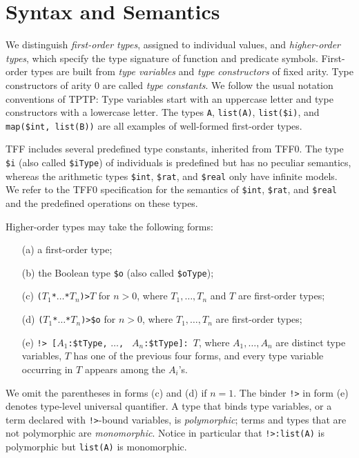 \section{Syntax and Semantics} \label{sec_logic}

We distinguish {\em first-order types}, assigned
to individual values, and {\em higher-order types\/},
which specify the type signature of function and predicate symbols.
%
First-order types are built from {\em type variables\/}
and {\em type constructors\/} of fixed arity. Type constructors
of arity 0 are called {\em type constants}. We follow the usual
notation conventions of TPTP: Type variables start with an
uppercase letter and type constructors with a lowercase letter.
The types \verb+A+, \verb+list(A)+, \verb+list($i)+, and
\verb+map($int,+~\verb+list(B))+ are all examples of well-formed first-order
types.

TFF includes several predefined type constants, inherited from TFF0.
The type \verb+$i+ (also called \verb+$iType+) of individuals is predefined
but has no peculiar semantics, whereas the arithmetic types
\verb+$int+, \verb+$rat+, and \verb+$real+ only have infinite models. We refer
to the TFF0 specification \cite{TFF0} for the semantics of
\verb+$int+, \verb+$rat+, and \verb+$real+ and the predefined operations on
these types. %

Higher-order types may take the following forms:
%
\begin{enumerate}
\item[(a)] a first-order type;
\item[(b)] the Boolean type \verb+$o+ (also called \verb+$oType+);
\item[(c)] {\tt ($T_1$\;*\;${\dots}$\;*\;$T_n$)\;>\;$T$} for $n > 0$,
where $T_1,\dots,T_n$ and $T$ are first-order types;
\item[(d)] {\tt ($T_1$\;*\;${\dots}$\;*\;$T_n$)\;>\;\$o} for $n > 0$,
where $T_1,\dots,T_n$ are first-order types;
\item[(e)] {\tt !>\ [$A_1$\;:\;\$tType,} {\tt ${\dots}$,} {\tt
$A_n$\;:\;\$tType]:\ $T$}, where $A_1,\dots,A_n$ are distinct type variables, $T$
has one of the previous four forms, and every type variable occurring in $T$
appears among the $A_i$'s.
\end{enumerate}
%
We omit the parentheses in forms (c) and (d) if $n = 1$. The binder {\tt !>} in
form (e) denotes type-level universal quantifier. A type that binds type
variables, or a term declared with {\tt !>}-bound variables, is {\em
polymorphic}; terms and types that are not polymorphic are {\em monomorphic}.
Notice in particular that {\tt !>\;[$A$\;:\;\$tType]:\;list(A)} is polymorphic
but {\tt list(A)} is monomorphic.

